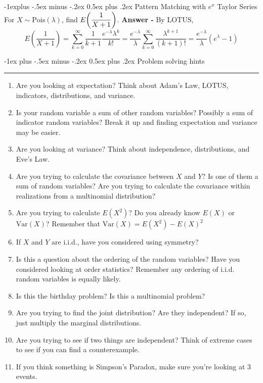 \documentclass[10pt,landscape]{article}
\makeatletter
\theoremstyle{definition}
\newcommand{\var}{\textrm{Var}}
\newcommand{\Pois}{\textrm{Pois}}
\renewcommand{\section}{\@startsection{section}{1}{0mm}%
                                {-1ex plus -.5ex minus -.2ex}%
                                {0.5ex plus .2ex}%
                                {\normalfont\large\bfseries}}
\renewcommand{\subsection}{\@startsection{subsection}{2}{0mm}%
                                {-1explus -.5ex minus -.2ex}%
                                {0.5ex plus .2ex}%
                                {\normalfont\normalsize\bfseries}}
\makeatother
\begin{document}
\begin{multicols}{3}
\subsection{Pattern Matching with $e^x$ Taylor Series}
For $X \sim \Pois(\lambda)$, find $\displaystyle E\bigg{(}\frac{1}{X+1}\bigg{)}$. \textbf{Answer - } By LOTUS,
\[E\left(\frac{1}{X+1}\right) = \displaystyle\sum_{k=0}^\infty \frac{1}{k+1} \frac{e^{-\lambda}\lambda^k}{k!} = \frac{e^{-\lambda}}{\lambda}\sum_{k=0}^\infty \frac{\lambda^{k+1}}{(k+1)!} = \boxed{\frac{e^{-\lambda}}{\lambda}(e^\lambda-1)}\]

\section{Problem solving hints} \smallskip \hrule height 2pt \smallskip
\begin{enumerate} \itemsep -.5em
\item Are you looking at expectation? Think about Adam's Law, LOTUS, indicators, distributions, and variance. 
\item Is your random variable a sum of other random variables? Possibly a sum of indicator random variables? Break it up and finding expectation and variance may be easier.
\item Are you looking at variance? Think about independence, distributions, and Eve's Law.
\item Are you trying to calculate the covariance between $X$ and $Y$? Is one of them a sum of random variables? Are you trying to calculate the covariance within realizations from a multinomial distribution?
\item Are you trying to calculate $E(X^2)$? Do you already know $E(X)$ or $\var(X)$? Remember that $\var(X) = E(X^2) - E(X)^2$
\item If $X$ and $Y$ are i.i.d., have you considered using symmetry?
\item Is this a question about the ordering of the random variables? Have you considered looking at order statistics? Remember any ordering of i.i.d. random variables is equally likely.
\item Is this the birthday problem? Is this a multinomial problem?
\item Are you trying to find the joint distribution? Are they independent? If so, just multiply the marginal distributions.
\item Are you trying to see if two things are independent? Think of extreme cases to see if you can find a counterexample.
\item If you think something is Simpson's Paradox, make sure you're looking at 3 events. 
\end{enumerate}

\end{multicols}
\end{document}
